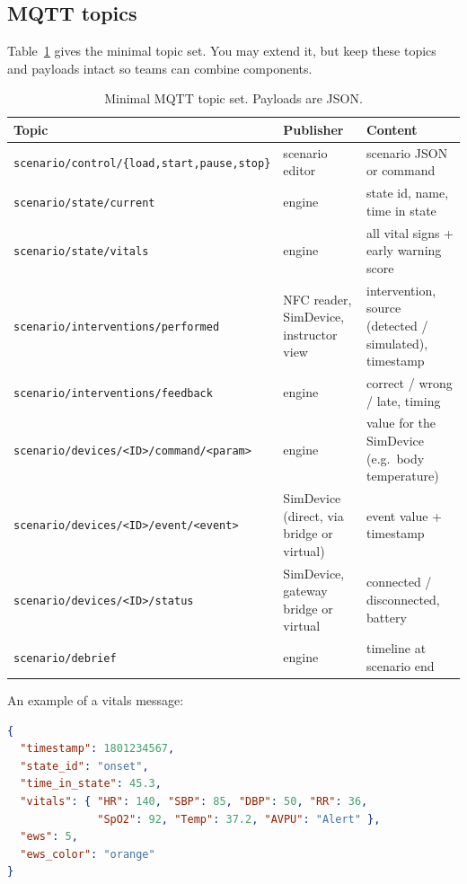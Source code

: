 \documentclass[11pt,a4paper]{article}
\begin{document}
\subsection{MQTT topics}
Table~\ref{tab:mqtt} gives the minimal topic set. You may extend it, but keep
these topics and payloads intact so teams can combine components.

\begin{table}[h]
\centering
\small
\begin{tabularx}{\linewidth}{@{}>{\raggedright\arraybackslash\footnotesize}p{6.3cm} >{\raggedright\arraybackslash}p{2.6cm} >{\raggedright\arraybackslash}X@{}}
\toprule
\textbf{Topic} & \textbf{Publisher} & \textbf{Content} \\
\midrule
\texttt{scenario/control/\{load,start,pause,stop\}} & scenario editor & scenario JSON or command \\
\texttt{scenario/state/current}                   & engine & state id, name, time in state \\
\texttt{scenario/state/vitals}                    & engine & all vital signs + early warning score \\
\texttt{scenario/interventions/performed}         & NFC reader, SimDevice, instructor view & intervention, source (detected / simulated), timestamp \\
\texttt{scenario/interventions/feedback}          & engine & correct / wrong / late, timing \\
\texttt{scenario/devices/<ID>/command/<param>}   & engine & value for the SimDevice (e.g.\ body temperature) \\
\texttt{scenario/devices/<ID>/event/<event>}     & SimDevice (direct, via bridge or virtual) & event value + timestamp \\
\texttt{scenario/devices/<ID>/status}            & SimDevice, gateway bridge or virtual & connected / disconnected, battery \\
\texttt{scenario/debrief}                         & engine & timeline at scenario end \\
\bottomrule
\end{tabularx}
\caption{Minimal MQTT topic set. Payloads are JSON.}
\label{tab:mqtt}
\end{table}

An example of a vitals message:
\begin{lstlisting}[language=json]
{
  "timestamp": 1801234567,
  "state_id": "onset",
  "time_in_state": 45.3,
  "vitals": { "HR": 140, "SBP": 85, "DBP": 50, "RR": 36,
              "SpO2": 92, "Temp": 37.2, "AVPU": "Alert" },
  "ews": 5,
  "ews_color": "orange"
}
\end{lstlisting}
\end{document}
